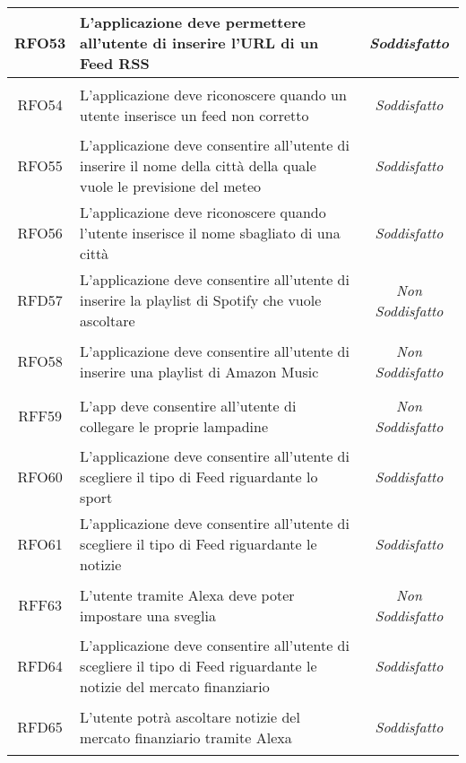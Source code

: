 \begin{longtable}{|c|>{\centering}m{7cm}|c|}
	\hypertarget{RFO53}{RFO53} & L'applicazione deve permettere all'utente di inserire l'URL di un Feed RSS & \textit{Soddisfatto}\\ \hline
	
	\hypertarget{RFO54}{RFO54} & L'applicazione deve riconoscere quando un utente inserisce un feed non corretto & \textit{Soddisfatto}\\ \hline
	
	\hypertarget{RFO55}{RFO55} & L'applicazione deve consentire all'utente di inserire il nome della città della quale vuole le previsione del meteo & \textit{Soddisfatto}\\ \hline
	
	\hypertarget{RFO56}{RFO56} & L'applicazione deve riconoscere quando l'utente inserisce il nome sbagliato di una città & \textit{Soddisfatto}\\ \hline
	
	\hypertarget{RFD57}{RFD57} & L'applicazione deve consentire all'utente di inserire la playlist di Spotify che vuole ascoltare & \textit{Non Soddisfatto}\\ \hline
	
	\hypertarget{RFO58}{RFO58} & L'applicazione deve consentire all'utente di inserire una playlist di Amazon Music & \textit{Non Soddisfatto}\\ \hline
	
	\hypertarget{RFF59}{RFF59} & L'app deve consentire all'utente di collegare le proprie lampadine & \textit{Non Soddisfatto}\\ \hline
	
	\hypertarget{RFO60}{RFO60} & L'applicazione deve consentire all'utente di scegliere il tipo di Feed riguardante lo sport & \textit{Soddisfatto}\\ \hline
	
	\hypertarget{RFO61}{RFO61} & L'applicazione deve consentire all'utente di scegliere il tipo di Feed riguardante le notizie & \textit{Soddisfatto}\\ \hline
	
	\hypertarget{RFF63}{RFF63} & L'utente tramite Alexa deve poter impostare una sveglia & \textit{Non Soddisfatto}\\ \hline
	
	\hypertarget{RFD64}{RFD64} & L'applicazione deve consentire all'utente di scegliere il tipo di Feed riguardante le notizie del mercato finanziario & \textit{Soddisfatto}\\ \hline
	
	\hypertarget{RFD65}{RFD65} & L'utente potrà ascoltare notizie del mercato finanziario tramite Alexa & \textit{Soddisfatto}\\ \hline
	

\end{longtable}
